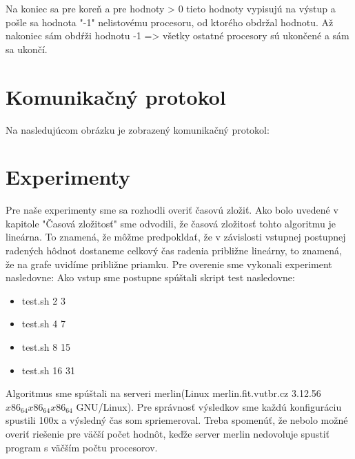 \documentclass[12pt,a4paper,titlepage,final]{article}
\begin{document}
Na koniec sa pre koreň a pre hodnoty > 0 tieto hodnoty vypisujú na výstup a pošle sa hodnota "-1" nelistovému procesoru, od ktorého obdržal hodnotu. Až nakoniec sám obdŕži hodnotu -1 => všetky ostatné procesory sú ukončené a sám sa ukončí.


\section{Komunikačný protokol}
Na nasledujúcom obrázku je zobrazený komunikačný protokol:






\section{Experimenty}
Pre naše experimenty sme sa rozhodli overiť časovú zložiť. Ako bolo uvedené v kapitole "Časová zložitosť" sme odvodili, že časová zložitosť tohto algoritmu je lineárna. To znamená, že môžme predpokldať, že v závislosti vstupnej postupnej radených hôdnot dostaneme celkový čas radenia približne lineárny, to znamená, že na grafe uvidíme približne priamku. Pre overenie sme vykonali experiment nasledovne: Ako vstup sme postupne spúštali skript test nasledovne:
\begin{itemize}
\item test.sh 2 3
\item test.sh 4 7
\item test.sh 8 15
\item test.sh 16 31
\end{itemize}
Algoritmus sme spúštali na serveri merlin(Linux merlin.fit.vutbr.cz 3.12.56 $x86_64 x86_64 x86_64$ GNU/Linux). Pre správnosť výsledkov sme každú konfiguráciu spustili 100x a výsledný čas som spriemeroval. Treba spomenúť, že nebolo možné overiť riešenie pre väčší počet hodnôt, keďže server merlin nedovoluje spustiť program s väčším počtu procesorov.
\end{document}
